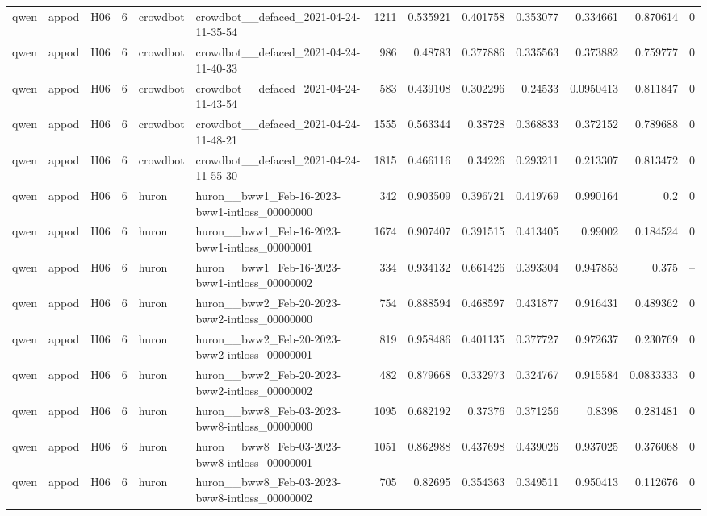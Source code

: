 \begin{longtable}{lllrllrrrrrrr}
qwen & appod & H06 & 6 & crowdbot & crowdbot\_\_defaced\_2021-04-24-11-35-54 & 1211 & 0.535921 & 0.401758 & 0.353077 & 0.334661 & 0.870614 & 0 \\
qwen & appod & H06 & 6 & crowdbot & crowdbot\_\_defaced\_2021-04-24-11-40-33 & 986 & 0.48783 & 0.377886 & 0.335563 & 0.373882 & 0.759777 & 0 \\
qwen & appod & H06 & 6 & crowdbot & crowdbot\_\_defaced\_2021-04-24-11-43-54 & 583 & 0.439108 & 0.302296 & 0.24533 & 0.0950413 & 0.811847 & 0 \\
qwen & appod & H06 & 6 & crowdbot & crowdbot\_\_defaced\_2021-04-24-11-48-21 & 1555 & 0.563344 & 0.38728 & 0.368833 & 0.372152 & 0.789688 & 0 \\
qwen & appod & H06 & 6 & crowdbot & crowdbot\_\_defaced\_2021-04-24-11-55-30 & 1815 & 0.466116 & 0.34226 & 0.293211 & 0.213307 & 0.813472 & 0 \\
qwen & appod & H06 & 6 & huron & huron\_\_bww1\_Feb-16-2023-bww1-intloss\_00000000 & 342 & 0.903509 & 0.396721 & 0.419769 & 0.990164 & 0.2 & 0 \\
qwen & appod & H06 & 6 & huron & huron\_\_bww1\_Feb-16-2023-bww1-intloss\_00000001 & 1674 & 0.907407 & 0.391515 & 0.413405 & 0.99002 & 0.184524 & 0 \\
qwen & appod & H06 & 6 & huron & huron\_\_bww1\_Feb-16-2023-bww1-intloss\_00000002 & 334 & 0.934132 & 0.661426 & 0.393304 & 0.947853 & 0.375 & -- \\
qwen & appod & H06 & 6 & huron & huron\_\_bww2\_Feb-20-2023-bww2-intloss\_00000000 & 754 & 0.888594 & 0.468597 & 0.431877 & 0.916431 & 0.489362 & 0 \\
qwen & appod & H06 & 6 & huron & huron\_\_bww2\_Feb-20-2023-bww2-intloss\_00000001 & 819 & 0.958486 & 0.401135 & 0.377727 & 0.972637 & 0.230769 & 0 \\
qwen & appod & H06 & 6 & huron & huron\_\_bww2\_Feb-20-2023-bww2-intloss\_00000002 & 482 & 0.879668 & 0.332973 & 0.324767 & 0.915584 & 0.0833333 & 0 \\
qwen & appod & H06 & 6 & huron & huron\_\_bww8\_Feb-03-2023-bww8-intloss\_00000000 & 1095 & 0.682192 & 0.37376 & 0.371256 & 0.8398 & 0.281481 & 0 \\
qwen & appod & H06 & 6 & huron & huron\_\_bww8\_Feb-03-2023-bww8-intloss\_00000001 & 1051 & 0.862988 & 0.437698 & 0.439026 & 0.937025 & 0.376068 & 0 \\
qwen & appod & H06 & 6 & huron & huron\_\_bww8\_Feb-03-2023-bww8-intloss\_00000002 & 705 & 0.82695 & 0.354363 & 0.349511 & 0.950413 & 0.112676 & 0 \\

\end{longtable}

